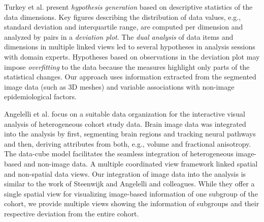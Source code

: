\documentclass[journal]{style/vgtc} 			          %
\newcommand{\rem}[1]{\textcolor{red}{\sout{#1}}}
\begin{document}
Turkey et al. \cite{Turkay2013} present \emph{hypothesis generation} based on descriptive statistics of the data dimensions.
%
Key figures describing the distribution of data values, e.g., standard deviation and interquartile range, are computed per dimension and analyzed by pairs in a \emph{deviation plot}.
%
%
The \emph{dual analysis} of data items and dimensions in multiple linked views led to several hypotheses in analysis sessions with domain experts.
%
Hypotheses based on observations in the deviation plot may impose \emph{overfitting} to the data because the measures highlight only parts of the statistical changes.
%
Our approach uses information extracted from the segmented image data (such as 3D meshes) and variable associations with non-image epidemiological factors.

Angelelli et al. \cite{Angelelli2014} focus on a suitable data organization for the interactive visual analysis of heterogeneous cohort study data.
%
%
Brain image data was integrated into the analysis by first, segmenting brain regions and tracking neural pathways and then, deriving attributes from both, e.g., volume and fractional anisotropy.
%
The data-cube model facilitates the seamless integration of heterogeneous image-based and non-image data.
%
A multiple coordinated view framework linked spatial and non-spatial data views.
%
%
Our integration of image data into the analysis is similar to the work of Steenwijk \cite{Steenwijk2010} and Angelelli \cite{Angelelli2014} and colleagues.
%
While they offer a single spatial view for visualizing image-based information of one subgroup of the cohort, we provide multiple views showing the information of subgroups and their respective deviation from the entire cohort.
%
\end{document}
